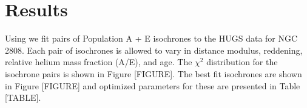 \section{Results}\label{sec:results}
Using \fidanka we fit pairs of Population A + E isochrones to the HUGS data for
NGC 2808. Each pair of isochrones is allowed to vary in distance modulus,
reddening, relative helium mass fraction (A/E), and age. The $\chi^{2}$
distribution for the isochrone pairs is shown in Figure {\color{red}[FIGURE]}.
The best fit isochrones are shown in Figure {\color{red}[FIGURE]} and optimized
parameters for these are presented in Table {\color{red}[TABLE]}.
